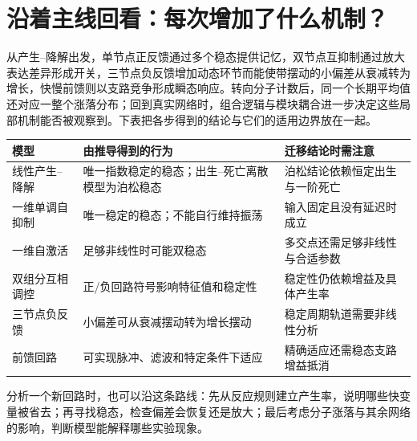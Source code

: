 \documentclass[11pt,a4paper,UTF8,fontset=fandol]{ctexart}
\begin{document}
\section{沿着主线回看：每次增加了什么机制？}
从产生--降解出发，单节点正反馈通过多个稳态提供记忆，双节点互抑制通过放大表达差异形成开关，三节点负反馈增加动态环节而能使带摆动的小偏差从衰减转为增长，快慢前馈则以支路竞争形成瞬态响应。转向分子计数后，同一个长期平均值还对应一整个涨落分布；回到真实网络时，组合逻辑与模块耦合进一步决定这些局部机制能否被观察到。下表把各步得到的结论与它们的适用边界放在一起。
\begin{center}\begin{tabular}{>{\raggedright\arraybackslash}p{3.1cm}>{\raggedright\arraybackslash}p{6cm}>{\raggedright\arraybackslash}p{5.6cm}}\toprule
模型 & 由推导得到的行为 & 迁移结论时需注意\\\midrule
线性产生--降解 & 唯一指数稳定的稳态；出生--死亡离散模型为泊松稳态 & 泊松结论依赖恒定出生与一阶死亡\\
一维单调自抑制 & 唯一稳定的稳态；不能自行维持振荡 & 输入固定且没有延迟时成立\\
一维自激活 & 足够非线性时可能双稳态 & 多交点还需足够非线性与合适参数\\
双组分互相调控 & 正/负回路符号影响特征值和稳定性 & 稳定性仍依赖增益及具体产生率\\
三节点负反馈 & 小偏差可从衰减摆动转为增长摆动 & 稳定周期轨道需要非线性分析\\
前馈回路 & 可实现脉冲、滤波和特定条件下适应 & 精确适应还需稳态支路增益抵消\\
\bottomrule\end{tabular}\end{center}

分析一个新回路时，也可以沿这条路线：先从反应规则建立产生率，说明哪些快变量被省去；再寻找稳态，检查偏差会恢复还是放大；最后考虑分子涨落与其余网络的影响，判断模型能解释哪些实验现象。
\end{document}
